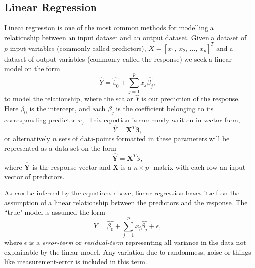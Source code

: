 
  

\subsection{Linear Regression}

Linear regression is one of the most common methods for modelling a relationship between an input dataset and an output dataset.
Given a dataset of $p$ input variables (commonly called predictors), $X=[x_1, \, x_2, \, \ldots, \, x_p]^T$ and a dataset of output variables (commonly called the response) we seek a linear model on the form
\begin{equation}
\hat{Y}=\hat{\beta_0}+\sum_{j=1}^{p}x_j\hat{\beta_j},
\end{equation}
to model the relationship, where the scalar $\hat{Y}$ is our prediction of the response. 
Here $\beta_0$ is the intercept, and each $\beta_j$ is the coefficient belonging to its corresponding predictor $x_j$. 
This equation is commonly written in vector form, 
\begin{equation}
\hat{Y}=\boldsymbol{X}^T\boldsymbol{\beta},
\end{equation}
or alternatively $n$ sets of data-points formatted in these parameters will be represented as a data-set on the form
\begin{equation}
\boldsymbol{\hat{Y}}=\boldsymbol{X}^T\boldsymbol{\beta},
\end{equation}
where $\boldsymbol{\hat{Y}}$ is the response-vector and $\boldsymbol{X}$ is a $n\times p$ -matrix with each row an input-vector of predictors.

  

As can be inferred by the equations above, linear regression bases itself on the assumption of a linear relationship between the predictors and the response.
The ``true" model is assumed the form 
\begin{equation}
Y=\hat{\beta_0}+\sum_{j=1}^{p}x_j\hat{\beta_j}+\epsilon,
\end{equation}
where $\epsilon$ is a \textit{error-term} or \textit{residual-term} representing all variance in the data not explainable by the linear model. 
Any variation due to randomness, noise or things like measurement-error is included in this term. 


